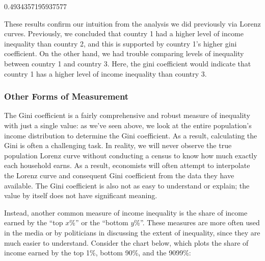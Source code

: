 \documentclass[letterpaper,10pt,english]{jupyterBook}
\begin{document}
\begin{sphinxVerbatim}[commandchars=\\\{\}]
  
\end{sphinxVerbatim}

\begin{sphinxVerbatim}[commandchars=\\\{\}]
0.4934357195937577
\end{sphinxVerbatim}

\sphinxAtStartPar
These results confirm our intuition from the analysis we did previously via Lorenz curves. Previously, we concluded that country 1 had a higher level of income inequality than country 2, and this is supported by country 1’s higher gini coefficient. On the other hand, we had trouble comparing levels of inequality between country 1 and country 3. Here, the gini coefficient would indicate that country 1 has a higher level of income inequality than country 3.


\subsubsection{Other Forms of Measurement}
\label{\detokenize{content/06-inequality/inequality:other-forms-of-measurement}}
\sphinxAtStartPar
The Gini coefficient is a fairly comprehensive and robust measure of inequality with just a single value: as we’ve seen above, we look at the entire population’s income distribution to determine the Gini coefficient. As a result, calculating the Gini is often a challenging task. In reality, we will never observe the true population Lorenz curve without conducting a census to know how much exactly each household earns. As a result, economists will often attempt to interpolate the Lorenz curve and consequent Gini coefficient from the data they have available. The Gini coefficient is also not as easy to understand or explain; the value by itself does not have significant meaning.

\sphinxAtStartPar
Instead, another common measure of income inequality is the share of income earned by the “top \(x\)\%” or the “bottom \(y\)\%”. These measures are more often used in the media or by politicians in discussing the extent of inequality, since they are much easier to understand. Consider the chart below, which plots the share of income earned by the top 1\%, bottom 90\%, and the 90\sphinxhyphen{}99\%:
\end{document}
